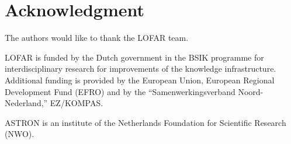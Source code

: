 \documentclass[journal]{IEEEtran}
\begin{document}

\section{}


\section*{Acknowledgment}


The authors would like to thank the LOFAR team. 

LOFAR is funded by the Dutch government in the BSIK programme for
interdisciplinary research for improvements of the knowledge infrastructure.
Additional funding is provided by the European Union, European Regional
Development Fund (EFRO) and by the ``Samenwerkingsverband Noord-Nederland,''
EZ/KOMPAS.

ASTRON is an institute of the Netherlands Foundation for Scientific Research (NWO).

\ifCLASSOPTIONcaptionsoff
  \newpage
\fi





%
%
%
%
%


\end{document}
